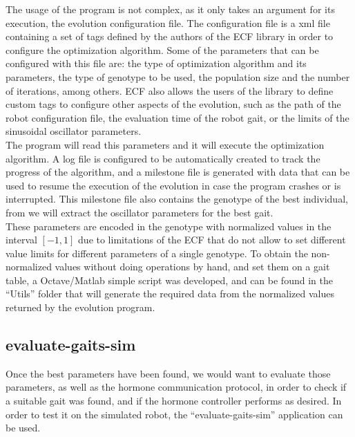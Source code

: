The usage of the program is not complex, as it only takes an argument for its execution, the evolution configuration file. The configuration file is a xml file containing a set of tags defined by the authors of the ECF library in order to configure the optimization algorithm. Some of the parameters that can be configured with this file are: the type of optimization algorithm and its parameters, the type of genotype to be used, the population size and the number of iterations, among others. ECF also allows the users of the library to define custom tags to configure other aspects of the evolution, such as the path of the robot configuration file, the evaluation time of the robot gait, or the limits of the sinusoidal oscillator parameters.\\

The program will read this parameters and it will execute the optimization algorithm. A log file is configured to be automatically created to track the progress of the algorithm, and a milestone file is generated with data that can be used to resume the execution of the evolution in case the program crashes or is interrupted. This milestone file also contains the genotype of the best individual, from we will extract the oscillator parameters for the best gait.\\

These parameters are encoded in the genotype with normalized values in the interval $[-1, 1]$ due to limitations of the ECF that do not allow to set different value limits for different parameters of a single genotype. To obtain the non-normalized values without doing operations by hand, and set them on a gait table, a Octave/Matlab simple script was developed, and can be found in the ``Utils'' folder that will generate the required data from the normalized values returned by the evolution program.\\


\subsection{evaluate-gaits-sim}
\label{software_evaluate-gaits-sim}
Once the best parameters have been found, we would want to evaluate those parameters, as well as the hormone communication protocol, in order to check if a suitable gait was found, and if the hormone controller performs as desired. In order to test it on the simulated robot, the ``evaluate-gaits-sim'' application can be used.\\

